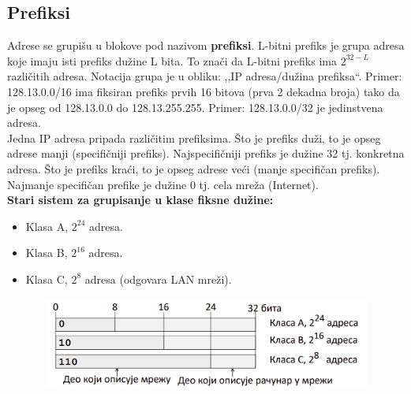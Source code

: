 \documentclass[a4paper]{article}
\begin{document}
    \subsection{Prefiksi}
        Adrese se grupišu u blokove pod nazivom \textbf{prefiksi}. L-bitni prefiks je grupa adresa
        koje imaju isti prefiks dužine L bita. To znači da L-bitni prefiks ima $2^{32-L}$ 
        različitih adresa. Notacija grupa je u obliku: ,,IP adresa/dužina prefiksa``. Primer:
        128.13.0.0/16 ima fiksiran prefiks prvih 16 bitova (prva 2 dekadna broja) tako da je
        opseg od 128.13.0.0 do 128.13.255.255. Primer: 128.13.0.0/32 je jedinstvena adresa. \\
        \indent Jedna IP adresa pripada različitim prefiksima. Što je prefiks duži, to je 
        opseg adrese manji (specifičniji prefiks). Najspecifičniji prefiks je dužine 32 tj.
        konkretna adresa. Što je prefiks kraći, to je opseg adrese veći (manje specifičan prefiks).
        Najmanje specifičan prefike je dužine 0 tj. cela mreža (Internet).\\

        \noindent \textbf{Stari sistem za grupisanje u klase fiksne dužine:}
        \begin{itemize}
            \item Klasa A, $2^{24}$ adresa.
            \item Klasa B, $2^{16}$ adresa.
            \item Klasa C, $2^{8}$ adresa (odgovara LAN mreži).
        \end{itemize}
        \begin{figure}[H]
            \begin{center}
                \includegraphics[width=120mm,height=30mm]{Slike/ip_prefiksi_stara_klasifikacija.png}
            \end{center}
        \end{figure}
\end{document}
